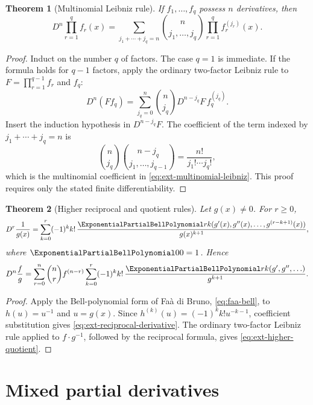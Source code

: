 \documentclass[11pt,a4paper,oneside,openany]{book}
\newtheorem{theorem}{Theorem}[chapter]
\theoremstyle{definition}
\theoremstyle{remark}
\begin{document}
\begin{theorem}[Multinomial Leibniz rule]
If \(f_1,\ldots,f_q\) possess \(n\) derivatives, then
\begin{equation}\label{eq:ext-multinomial-leibniz}
 D^n\prod_{r=1}^q f_r(x)
 =\sum_{j_1+\cdots+j_q=n}
 \binom{n}{j_1,\ldots,j_q}
 \prod_{r=1}^q f_r^{(j_r)}(x).
\end{equation}
\end{theorem}
\begin{proof}
Induct on the number \(q\) of factors.  The case \(q=1\) is immediate.  If the
formula holds for \(q-1\) factors, apply the ordinary two-factor Leibniz rule
to \(F=\prod_{r=1}^{q-1}f_r\) and \(f_q\):
\[
 D^n(Ff_q)=\sum_{j_q=0}^n\binom n{j_q}
 D^{n-j_q}F\,f_q^{(j_q)}.
\]
Insert the induction hypothesis in \(D^{n-j_q}F\).  The coefficient of the
term indexed by \(j_1+\cdots+j_q=n\) is
\[
 \binom n{j_q}\binom{n-j_q}{j_1,\ldots,j_{q-1}}
 =\frac{n!}{j_1!\cdots j_q!},
\]
which is the multinomial coefficient in
\eqref{eq:ext-multinomial-leibniz}.  This proof requires only the stated
finite differentiability.
\end{proof}

\begin{theorem}[Higher reciprocal and quotient rules]
Let \(g(x)\ne0\).  For \(r\ge0\),
\begin{equation}\label{eq:ext-reciprocal-derivative}
 D^r\frac1{g(x)}
 =\sum_{k=0}^r(-1)^kk!\,
 \frac{\ExponentialPartialBellPolynomial rk(g'(x),g''(x),\ldots,g^{(r-k+1)}(x))}{g(x)^{k+1}},
\end{equation}
where \(\ExponentialPartialBellPolynomial00=1\).  Hence
\begin{equation}\label{eq:ext-higher-quotient}
 D^n\frac{f}{g}
 =\sum_{r=0}^n\binom nr f^{(n-r)}
 \sum_{k=0}^r(-1)^kk!\,
 \frac{\ExponentialPartialBellPolynomial rk(g',g'',\ldots)}{g^{k+1}}.
\end{equation}
\end{theorem}
\begin{proof}
Apply the Bell-polynomial form of Fa\`a di Bruno,
\eqref{eq:faa-bell}, to \(h(u)=u^{-1}\) and \(u=g(x)\).  Since
\(h^{(k)}(u)=(-1)^kk!u^{-k-1}\), coefficient substitution gives
\eqref{eq:ext-reciprocal-derivative}.  The ordinary two-factor Leibniz rule
applied to \(f\cdot g^{-1}\), followed by the reciprocal formula, gives
\eqref{eq:ext-higher-quotient}.
\end{proof}

\section{Mixed partial derivatives}
\end{document}
